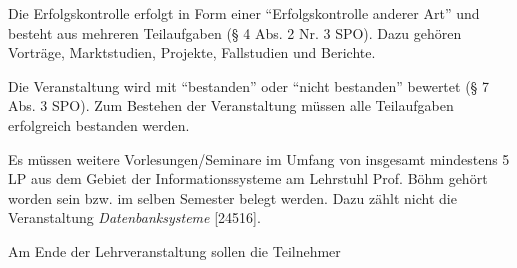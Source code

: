 \begin{course}

\setdoclanguagegerman
{}



\coursehead


\label{cour_7141.dp_997}


\begin{styleenv}
\begin{assessment}
Die Erfolgskontrolle erfolgt in Form einer “Erfolgskontrolle anderer Art” und besteht aus mehreren Teilaufgaben (§ 4 Abs. 2 Nr. 3 SPO). Dazu gehören Vorträge, Marktstudien, Projekte, Fallstudien und Berichte.

 

Die Veranstaltung wird mit “bestanden” oder “nicht bestanden” bewertet (§ 7 Abs. 3 SPO). Zum Bestehen der Veranstaltung müssen alle Teilaufgaben erfolgreich bestanden werden.


\end{assessment}

\begin{conditions}Es müssen weitere Vorlesungen/Seminare im Umfang von insgesamt mindestens 5 LP aus dem Gebiet der Informationssysteme am Lehrstuhl Prof. Böhm gehört worden sein bzw. im selben Semester belegt werden. Dazu zählt nicht die Veranstaltung \emph{Datenbanksysteme} [24516].

\end{conditions}


\end{styleenv}

\begin{learningoutcomes}
Am Ende der Lehrveranstaltung sollen die Teilnehmer


\end{learningoutcomes}
\end{course}
